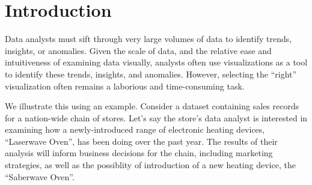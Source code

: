
\section{Introduction}
\label{sec:introduction}


Data analysts must sift through very large volumes of data 
to identify trends, insights, or anomalies. 
Given the scale of data, and the relative ease and 
intuitiveness of examining data visually,
analysts often use visualizations as a tool to identify
these trends, insights, and anomalies.
However, selecting the ``right'' visualization often 
remains a laborious and time-consuming task. 

We illustrate this using an example. 
Consider a dataset containing sales records for a nation-wide
chain of stores.
Let's say the store's data analyst is interested
in examining how a newly-introduced
range of electronic heating devices, ``Laserwave Oven'',
has been doing over the past year.
The results of their analysis will inform business decisions
for the chain, including marketing strategies, as well as
the possiblity of introduction of a new heating device, the ``Saberwave Oven''.

